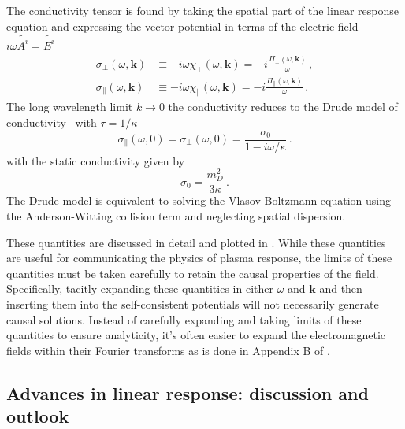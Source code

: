 The conductivity tensor is found by taking the spatial part of the linear response equation  and expressing the vector potential in terms of the electric field $i \omega \widetilde{A^i} = \widetilde{E^i}$~\cite{Starke:2014tfa,melrose2008quantum}
\begin{align}\label{eq:sigmaperp}
    \sigma_\perp(\omega,\boldsymbol{k}) &\equiv - i \omega \chi_\perp(\omega,\boldsymbol{k}) =- i \frac{\Pi_\perp(\omega,\boldsymbol{k})}{\omega} \,,\\
    \sigma_\parallel(\omega,\boldsymbol{k}) &\equiv - i \omega \chi_\parallel(\omega,\boldsymbol{k}) =- i \frac{\Pi_\parallel(\omega,\boldsymbol{k})}{\omega} \,.
\end{align} 
The long wavelength limit $k \to 0$ the conductivity reduces to the Drude model of conductivity~\cite{Drude:1900} with $\tau = 1/\kappa$
\begin{equation}\label{eq:drude}
    \sigma_\parallel(\omega,0) = \sigma_\perp(\omega,0) = \frac{\sigma_0}{1-i \omega/\kappa} \,.
\end{equation}
with the static conductivity given by
\begin{equation}\label{eq:condstat}
   \sigma_0 = \frac{m_D^2}{3\kappa}\,.
\end{equation} 
The Drude model is equivalent to solving the Vlasov-Boltzmann equation using the Anderson-Witting collision term  and neglecting spatial dispersion.

These quantities are discussed in detail and plotted in \cite{Formanek:2021blc}. While these quantities are useful for communicating the physics of plasma response, the limits of these quantities must be taken carefully to retain the causal properties of the field. Specifically, tacitly expanding these quantities in either $\omega$ and $\mathbf{k}$ and then inserting them into the self-consistent potentials  will not necessarily generate causal solutions. Instead of carefully expanding and taking limits of these quantities to ensure analyticity, it's often easier to expand the electromagnetic fields within their Fourier transforms as is done in Appendix B of \cite{Grayson:2022asf}.

\subsection{Advances in linear response: discussion and outlook}

